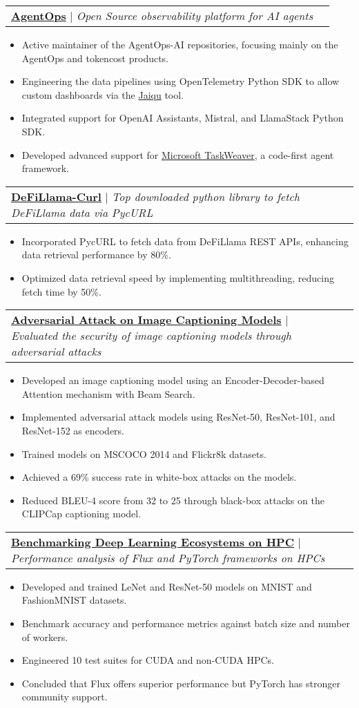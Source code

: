 \documentclass[letterpaper,11pt]{article}
\makeatletter
\newcommand{\resumeItem}[1]{
  \item\small{
    {#1 \vspace{-2pt}}
  }
}
\newcommand{\resumeProjectHeading}[2]{
    \item
    \begin{tabular*}{0.97\textwidth}{l@{\extracolsep{\fill}}r}
      \small#1 & #2 \\
    \end{tabular*}\vspace{-7pt}
}
\newcommand{\resumeItemListStart}{\begin{itemize}}
\newcommand{\resumeItemListEnd}{\end{itemize}\vspace{-5pt}}
\makeatother
\begin{document}
        \resumeProjectHeading
        {\textbf{\href{https://www.agentops.ai/}{AgentOps}} $|$ \footnotesize\emph{Open Source observability platform for AI agents}}{}
        \resumeItemListStart
            \resumeItem{Active maintainer of the AgentOps-AI repositories, focusing mainly on the AgentOps and tokencost products.}
            \resumeItem{Engineering the data pipelines using OpenTelemetry Python SDK to allow custom dashboards via the \href{https://github.com/agentops-ai/jaiqu/}{Jaiqu} tool.}
            \resumeItem{Integrated support for OpenAI Assistants, Mistral, and LlamaStack Python SDK.}
            \resumeItem{Developed advanced support for \href{https://github.com/microsoft/TaskWeaver}{Microsoft TaskWeaver}, a code-first agent framework.}
        \resumeItemListEnd

        \resumeProjectHeading
        {\textbf{\href{https://defillama-curl.readthedocs.io/}{DeFiLlama-Curl}} $|$ \footnotesize\emph{Top downloaded python library to fetch DeFiLlama data via PycURL}}{}
        \resumeItemListStart
            \resumeItem{Incorporated PycURL to fetch data from DeFiLlama REST APIs, enhancing data retrieval performance by 80\%.}
            \resumeItem{Optimized data retrieval speed by implementing multithreading, reducing fetch time by 50\%.}
        \resumeItemListEnd
    
        \resumeProjectHeading
        {\textbf{\href{https://github.com/katsamapol/Adversarial-Attack-to-Image-Caption}{Adversarial Attack on Image Captioning Models}} $|$ \footnotesize\emph{Evaluated the security of image captioning models through adversarial attacks}}{}
        \resumeItemListStart
            \resumeItem{Developed an image captioning model using an Encoder-Decoder-based Attention mechanism with Beam Search.}
            \resumeItem{Implemented adversarial attack models using ResNet-50, ResNet-101, and ResNet-152 as encoders.}
            \resumeItem{Trained models on MSCOCO 2014 and Flickr8k datasets.}
            \resumeItem{Achieved a 69\% success rate in white-box attacks on the models.}
            \resumeItem{Reduced BLEU-4 score from 32 to 25 through black-box attacks on the CLIPCap captioning model.}
        \resumeItemListEnd
          
        \resumeProjectHeading
        {\textbf{\href{https://github.com/the-praxs/dl-benchmark}{Benchmarking Deep Learning Ecosystems on HPC}} $|$ \footnotesize\emph{Performance analysis of Flux and PyTorch frameworks on HPCs}}{}
        \resumeItemListStart
            \resumeItem{Developed and trained LeNet and ResNet-50 models on MNIST and FashionMNIST datasets.}
            \resumeItem{Benchmark accuracy and performance metrics against batch size and number of workers.}
            \resumeItem{Engineered 10 test suites for CUDA and non-CUDA HPCs.}
            \resumeItem{Concluded that Flux offers superior performance but PyTorch has stronger community support.}
        \resumeItemListEnd
\end{document}
